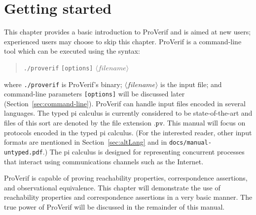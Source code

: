 \documentclass{book}
\newcommand{\nonterm}[1]{\langle\mathit{#1}\rangle}
\newcommand{\filenamevar}{\nonterm{filename}}
\begin{document}
\chapter{Getting started}\label{chap:basic}

This chapter provides a basic introduction to ProVerif and is aimed at new users; experienced users may choose to skip this chapter. ProVerif is a command-line tool which can be executed using the syntax:
\begin{quote}
	\texttt{./proverif} \texttt{[options]} $\filenamevar$
\end{quote}
where \texttt{./proverif} is ProVerif's binary; $\filenamevar$ is the input file; and command-line parameters \texttt{[options]} will be discussed later (Section~\ref{sec:command-line}). ProVerif can handle input files encoded in several languages. The typed pi calculus is currently considered to be state-of-the-art and files of this sort are denoted by the file extension $\texttt{.pv}$.
This manual will focus on protocols encoded in the typed pi calculus.
(For the interested reader, other input formats are mentioned in Section~\ref{sec:altLang} and in {\tt docs/manual-untyped.pdf}.)
The pi calculus is designed for representing concurrent processes that interact using communications channels such as the Internet.

ProVerif is capable of proving reachability properties, correspondence assertions, and observational equivalence. This chapter will demonstrate the use of reachability properties and  correspondence assertions in a very basic manner. The true power of ProVerif will be discussed in the remainder of this manual.

\end{document}
